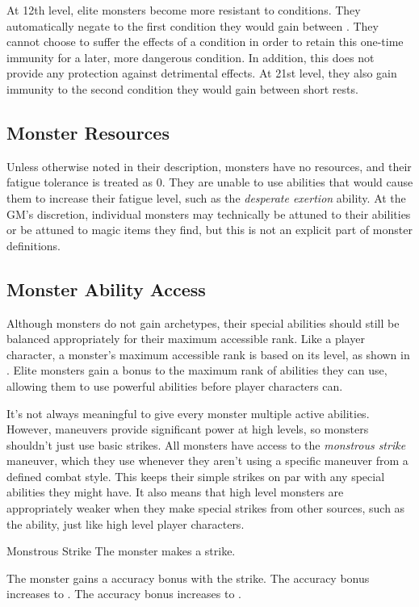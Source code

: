              At 12th level, elite monsters become more resistant to conditions.
            They automatically negate to the first condition they would gain between .
            They cannot choose to suffer the effects of a condition in order to retain this one-time immunity for a later, more dangerous condition.
            In addition, this does not provide any protection against detrimental  effects.
            At 21st level, they also gain immunity to the second condition they would gain between short rests.

        \subsection{Monster Resources}
            Unless otherwise noted in their description, monsters have no resources, and their fatigue tolerance is treated as 0.
            They are unable to use abilities that would cause them to increase their fatigue level, such as the \textit{desperate exertion} ability.
            At the GM's discretion, individual monsters may technically be attuned to their abilities or be attuned to magic items they find, but this is not an explicit part of monster definitions.

        \subsection{Monster Ability Access}\label{Monster Ability Access}
            Although monsters do not gain archetypes, their special abilities should still be balanced appropriately for their maximum accessible rank.
            Like a player character, a monster's maximum accessible rank is based on its level, as shown in .
            Elite monsters gain a  bonus to the maximum rank of abilities they can use, allowing them to use powerful abilities before player characters can.

            It's not always meaningful to give every monster multiple active abilities.
            However, maneuvers provide significant power at high levels, so monsters shouldn't just use basic strikes.
            All monsters have access to the \textit{monstrous strike} maneuver, which they use whenever they aren't using a specific maneuver from a defined combat style.
            This keeps their simple strikes on par with any special abilities they might have.
            It also means that high level monsters are appropriately weaker when they make special strikes from other sources, such as the  ability, just like high level player characters.
            \begin{activeability}{Monstrous Strike}
                \rankline
                The monster makes a strike.

                \rankline
                 The monster gains a  accuracy bonus with the strike.
                 The accuracy bonus increases to .
                 The accuracy bonus increases to .
            \end{activeability}

